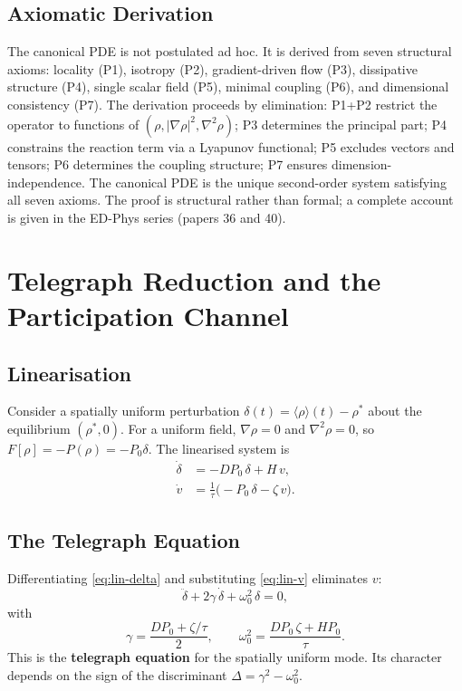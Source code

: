 \documentclass[11pt]{article}
\begin{document}
\subsection{Axiomatic Derivation}

The canonical PDE is not postulated ad hoc. It is derived from seven structural axioms: locality (P1), isotropy (P2), gradient-driven flow (P3), dissipative structure (P4), single scalar field (P5), minimal coupling (P6), and dimensional consistency (P7). The derivation proceeds by elimination: P1+P2 restrict the operator to functions of \((\rho, |\nabla\rho|^2, \nabla^2\rho)\); P3 determines the principal part; P4 constrains the reaction term via a Lyapunov functional; P5 excludes vectors and tensors; P6 determines the coupling structure; P7 ensures dimension-independence. The canonical PDE is the unique second-order system satisfying all seven axioms. The proof is structural rather than formal; a complete account is given in the ED-Phys series (papers 36 and 40).

\section{Telegraph Reduction and the Participation Channel}
\label{sec:telegraph}

\subsection{Linearisation}

Consider a spatially uniform perturbation \(\delta(t) = \langle\rho\rangle(t) - \rho^*\) about the equilibrium \((\rho^*, 0)\). For a uniform field, \(\nabla\rho = 0\) and \(\nabla^2\rho = 0\), so \(F[\rho] = -P(\rho) = -P_0\delta\). The linearised system is
\begin{align}
  \dot{\delta} &= -D P_0\,\delta + H\,v, \label{eq:lin-delta}\\
  \dot{v} &= \frac{1}{\tau}\bigl(-P_0\,\delta - \zeta\,v\bigr). \label{eq:lin-v}
\end{align}

\subsection{The Telegraph Equation}

Differentiating \eqref{eq:lin-delta} and substituting \eqref{eq:lin-v} eliminates \(v\):
\begin{equation}\label{eq:telegraph}
  \ddot{\delta} + 2\gamma\,\dot{\delta} + \omega_0^2\,\delta = 0,
\end{equation}
with
\begin{equation}\label{eq:telegraph-params}
  \gamma = \frac{D P_0 + \zeta/\tau}{2}, \qquad
  \omega_0^2 = \frac{D P_0\,\zeta + H P_0}{\tau}.
\end{equation}
This is the \textbf{telegraph equation} for the spatially uniform mode. Its character depends on the sign of the discriminant \(\Delta = \gamma^2 - \omega_0^2\).
\end{document}
